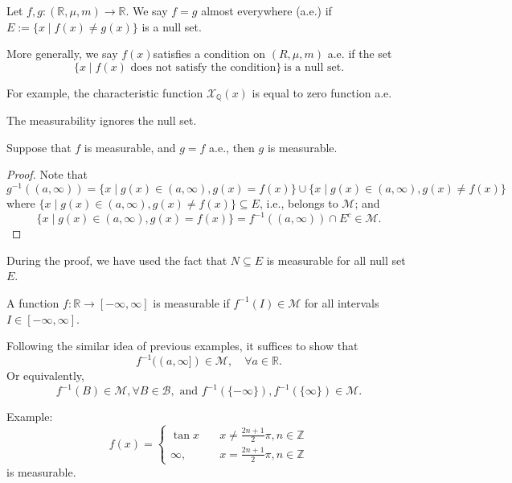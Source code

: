 \begin{definition}
Let $f,g:(\mathbb{R},\mu,m)\to\mathbb{R}$.
We say $f=g$ almost everywhere (a.e.)
if $E:=\{x\mid f(x)\ne g(x)\}$ is a null set.

More generally, we say $f(x) $satisfies a condition on $(R,\mu,m)$ a.e. if the set
\[
\{x\mid\text{$f(x)$ does not satisfy the condition}\}\ \text{is a null set}.
\]
\end{definition}
For example, the characteristic function $\mathcal{X}_{\mathbb{Q}}(x)$ is equal to zero function a.e.

The measurability ignores the null set.
\begin{proposition}\label{pro:9:3}
Suppose that $f$ is measurable, and $g=f$ a.e., then $g$ is measurable.
\end{proposition}
\begin{proof}
Note that 
\[
g^{-1}((a,\infty)) = \{x\mid g(x)\in(a,\infty), g(x)=f(x)\}\cup
\{x\mid g(x)\in(a,\infty), g(x)\ne f(x)\}
\]
where $\{x\mid g(x)\in(a,\infty), g(x)\ne f(x)\}\subseteq E$, i.e., belongs to $\mathcal{M}$;
and
\[
 \{x\mid g(x)\in(a,\infty), g(x)=f(x)\} = f^{-1}((a,\infty))\cap E^c\in\mathcal{M}.
\]

\end{proof}

\begin{remark}
During the proof, we have used the fact that $N\subseteq E$ is measurable for all null set $E$.
\end{remark}

\begin{definition}
A function $f:\mathbb{R}\to[-\infty,\infty]$ is measurable if 
$f^{-1}(I)\in\mathcal{M}$ for all intervals $I\in[-\infty,\infty]$.

Following the similar idea of previous examples, it suffices to show that
\[
f^{-1}((a,\infty])\in\mathcal{M},\quad
\forall a\in\mathbb{R}.
\]
Or equivalently,
\[
f^{-1}(B)\in\mathcal{M},\forall B\in\mathcal{B},\text{ and }f^{-1}(\{-\infty\}),f^{-1}(\{\infty\})\in\mathcal{M}.
\]
\end{definition}
Example:
\[
f(x)=\left\{
\begin{aligned}
\tan x&\quad x\ne\frac{2n+1}{2}\pi, n\in\mathbb{Z}\\
\infty,&\quad x=\frac{2n+1}{2}\pi, n\in\mathbb{Z}
\end{aligned}
\right.
\]
is measurable.






















